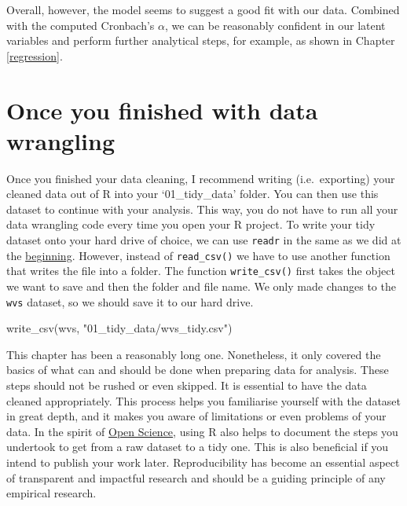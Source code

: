 \documentclass[
]{book}
\newenvironment{Shaded}{\begin{snugshade}}{\end{snugshade}}
\newcommand{\FunctionTok}[1]{\textcolor[rgb]{0.00,0.00,0.00}{#1}}
\newcommand{\NormalTok}[1]{#1}
\newcommand{\StringTok}[1]{\textcolor[rgb]{0.31,0.60,0.02}{#1}}
\begin{document}
Overall, however, the model seems to suggest a good fit with our data. Combined with the computed Cronbach's \(\alpha\), we can be reasonably confident in our latent variables and perform further analytical steps, for example, as shown in Chapter \ref{regression}.

\hypertarget{conclusion-data-wrangling}{%
\section{Once you finished with data wrangling}\label{conclusion-data-wrangling}}

Once you finished your data cleaning, I recommend writing (i.e.~exporting) your cleaned data out of R into your `01\_tidy\_data' folder. You can then use this dataset to continue with your analysis. This way, you do not have to run all your data wrangling code every time you open your R project. To write your tidy dataset onto your hard drive of choice, we can use \texttt{readr} in the same as we did at the \protect\hyperlink{importing-data-using-functions}{beginning}. However, instead of \texttt{read\_csv()} we have to use another function that writes the file into a folder. The function \texttt{write\_csv()} first takes the object we want to save and then the folder and file name. We only made changes to the \texttt{wvs} dataset, so we should save it to our hard drive.

\begin{Shaded}
\begin{Highlighting}[]
\FunctionTok{write\_csv}\NormalTok{(wvs, }\StringTok{"01\_tidy\_data/wvs\_tidy.csv"}\NormalTok{)}
\end{Highlighting}
\end{Shaded}

This chapter has been a reasonably long one. Nonetheless, it only covered the basics of what can and should be done when preparing data for analysis. These steps should not be rushed or even skipped. It is essential to have the data cleaned appropriately. This process helps you familiarise yourself with the dataset in great depth, and it makes you aware of limitations or even problems of your data. In the spirit of \href{https://osf.io}{Open Science}, using R also helps to document the steps you undertook to get from a raw dataset to a tidy one. This is also beneficial if you intend to publish your work later. Reproducibility has become an essential aspect of transparent and impactful research and should be a guiding principle of any empirical research.
\end{document}
